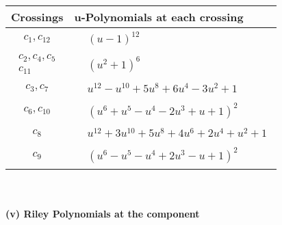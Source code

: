 \documentclass[1p]{elsarticle_modified}
\theoremstyle{definition}
\begin{document}
\begin{tabular}{m{50pt}|m{274pt}}
Crossings & \hspace{64pt}u-Polynomials at each crossing \\
\hline $$\begin{aligned}c_{1},c_{12}\end{aligned}$$&$\begin{aligned}
&(u-1)^{12}
\end{aligned}$\\
\hline $$\begin{aligned}c_{2},c_{4},c_{5}\\c_{11}\end{aligned}$$&$\begin{aligned}
&(u^2+1)^6
\end{aligned}$\\
\hline $$\begin{aligned}c_{3},c_{7}\end{aligned}$$&$\begin{aligned}
&u^{12}- u^{10}+5 u^8+6 u^4-3 u^2+1
\end{aligned}$\\
\hline $$\begin{aligned}c_{6},c_{10}\end{aligned}$$&$\begin{aligned}
&(u^6+u^5- u^4-2 u^3+u+1)^2
\end{aligned}$\\
\hline $$\begin{aligned}c_{8}\end{aligned}$$&$\begin{aligned}
&u^{12}+3 u^{10}+5 u^8+4 u^6+2 u^4+u^2+1
\end{aligned}$\\
\hline $$\begin{aligned}c_{9}\end{aligned}$$&$\begin{aligned}
&(u^6- u^5- u^4+2 u^3- u+1)^2
\end{aligned}$\\
\hline
\end{tabular}\\~\\
\newpage\renewcommand{\arraystretch}{1}
\flushleft \textbf{(v) Riley Polynomials at the component}\newline \\
\end{document}
